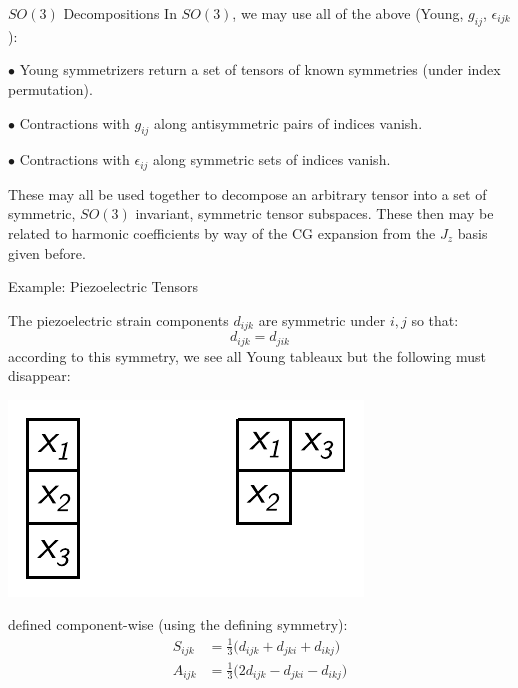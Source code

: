 \documentclass[11pt]{beamer}
\begin{document}
\begin{frame}{$SO(3)$ Decompositions}
\small
In $SO(3)$, we may use all of the above (Young, $g_{ij}$, $\epsilon_{ijk}$):

\medskip

$\bullet$ Young symmetrizers return a set of tensors of known symmetries (under index permutation).

\medskip


$\bullet$ Contractions with $g_{ij}$ along antisymmetric pairs of indices vanish.

\medskip

$\bullet$ Contractions with $\epsilon_{ij}$ along symmetric sets of indices vanish.

\vspace{1cm}

These may all be used together to decompose an arbitrary tensor into a set of symmetric, $SO(3)$ invariant, symmetric tensor subspaces. These then may be related to harmonic coefficients by way of the CG expansion from the $J_z$ basis given before.
\end{frame}
\begin{frame}{Example: Piezoelectric Tensors}

The piezoelectric strain components $d_{ijk}$ are symmetric under $i,j$ so that:
$$
d_{ijk}=d_{jik}
$$
according to this symmetry, we see all Young tableaux but the following must disappear:
\begin{center}
\includegraphics[scale=0.7]{piezo_young.pdf}
\end{center}defined component-wise (using the defining symmetry):
\begin{align*}
S_{ijk}&=\frac{1}{3}\big(d_{ijk}+d_{jki}+d_{ikj}\big)\\
A_{ijk}&=\frac{1}{3}\big(2d_{ijk}-d_{jki}-d_{ikj}\big)\\
\end{align*}
\end{frame}
\end{document}
